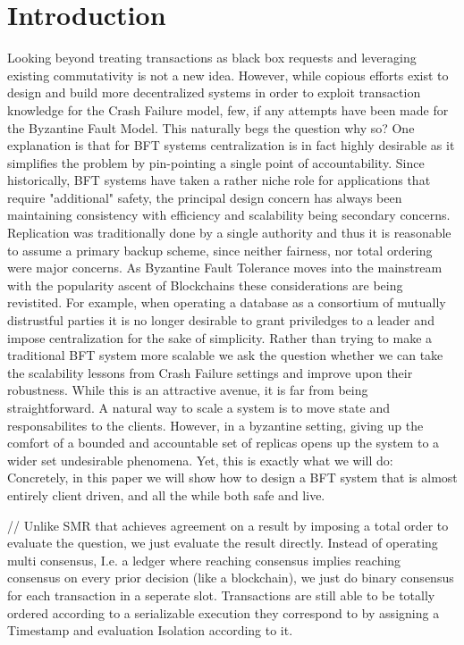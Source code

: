 \section{Introduction}





Looking beyond treating transactions as black box requests and leveraging existing commutativity is not a new idea. However, while copious efforts exist to design and build more decentralized systems in order to exploit transaction knowledge for the Crash Failure model, few, if any attempts have been made for the Byzantine Fault Model. This naturally begs the question why so? One explanation is that for BFT systems centralization is in fact highly desirable as it simplifies the problem by pin-pointing a single point of accountability. Since historically, BFT systems have taken a rather niche role for applications that require "additional" safety, the principal design concern has always been maintaining consistency with efficiency and scalability being secondary concerns. Replication was traditionally done by a single authority and thus it is reasonable to assume a primary backup scheme, since neither fairness, nor total ordering were major concerns. As Byzantine Fault Tolerance moves into the mainstream with the popularity ascent of Blockchains these considerations are being revistited. For example, when operating a database as a consortium of mutually distrustful parties it is no longer desirable to grant priviledges to a leader and impose centralization for the sake of simplicity.
Rather than trying to make a traditional BFT system more scalable we ask the question whether we can take the scalability lessons from Crash Failure settings and improve upon their robustness. While this is an attractive avenue, it is far from being straightforward. A natural way to scale a system is to move state and responsabilites to the clients.  
However, in a byzantine setting, giving up the comfort of a bounded and accountable set of replicas opens up the system to a wider set undesirable phenomena. Yet, this is exactly what we will do: Concretely, in this paper we will show how to design a BFT system that is almost entirely client driven, and all the while both safe and live. 


// Unlike SMR that achieves agreement on a result by imposing a total order to evaluate the question, we just evaluate the result directly. Instead of operating multi consensus, I.e. a ledger where reaching consensus implies reaching consensus on every prior decision (like a blockchain), we just do binary consensus for each transaction in a seperate slot. Transactions are still able to be totally ordered according to a serializable execution they correspond to by assigning a Timestamp and evaluation Isolation according to it.

